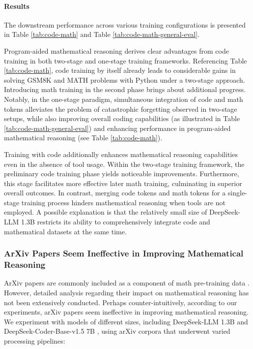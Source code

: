 \begin{itemize}[topsep=0pt]
\begin{itemize}[topsep=0pt]
\paragraph{Results}
The downstream performance across various training configurations is presented in Table \ref{tab:code-math} and Table \ref{tab:code-math-general-eval}.

Program-aided mathematical reasoning derives clear advantages from code training in both two-stage and one-stage training frameworks. Referencing Table \ref{tab:code-math}, code training by itself already leads to considerable gains in solving GSM8K and MATH problems with Python under a two-stage approach. Introducing math training in the second phase brings about additional progress. Notably, in the one-stage paradigm, simultaneous integration of code and math tokens alleviates the problem of catastrophic forgetting observed in two-stage setups, while also improving overall coding capabilities (as illustrated in Table \ref{tab:code-math-general-eval}) and enhancing performance in program-aided mathematical reasoning (see Table \ref{tab:code-math}).

Training with code additionally enhances mathematical reasoning capabilities even in the absence of tool usage. Within the two-stage training framework, the preliminary code training phase yields noticeable improvements. Furthermore, this stage facilitates more effective later math training, culminating in superior overall outcomes. In contrast, merging code tokens and math tokens for a single-stage training process hinders mathematical reasoning when tools are not employed. A possible explanation is that the relatively small size of DeepSeek-LLM 1.3B restricts its ability to comprehensively integrate code and mathematical datasets at the same time.

\subsubsection{ArXiv Papers Seem Ineffective in Improving Mathematical Reasoning}

ArXiv papers are commonly included as a component of math pre-training data \citep{minerva,gpt-f,llemma,mathpile}. However, detailed analysis regarding their impact on mathematical reasoning has not been extensively conducted. Perhaps counter-intuitively, according to our experiments, arXiv papers seem ineffective in improving mathematical reasoning. We experiment with models of different sizes, including DeepSeek-LLM 1.3B and DeepSeek-Coder-Base-v1.5 7B \citep{deepseek-coder}, using arXiv corpora that underwent varied processing pipelines:


\end{itemize}
\end{itemize}
